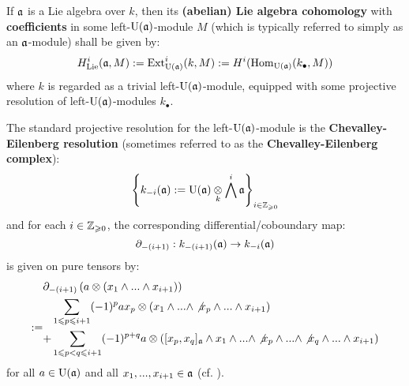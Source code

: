         \begin{definition} \label{def: lie_algebra_cohomology}
            If $\mathfrak{a}$ is a Lie algebra over $k$, then its \textbf{(abelian) Lie algebra cohomology} with \textbf{coefficients} in some left-$\mathrm{U}(\mathfrak{a})$-module $M$ (which is typically referred to simply as an $\mathfrak{a}$-module) shall be given by:
                $$H^i_{\mathrm{Lie}}(\mathfrak{a}, M) := \mathrm{Ext}^i_{\mathrm{U}(\mathfrak{a})}(k, M) := H^i( \mathrm{Hom}_{\mathrm{U}(\mathfrak{a})}(k_{\bullet}, M) )$$
            where $k$ is regarded as a trivial left-$\mathrm{U}(\mathfrak{a})$-module, equipped with some projective resolution of left-$\mathrm{U}(\mathfrak{a})$-modules $k_{\bullet}$.

            The standard projective resolution for the left-$\mathrm{U}(\mathfrak{a})$-module is the \textbf{Chevalley-Eilenberg resolution} (sometimes referred to as the \textbf{Chevalley-Eilenberg complex}):
                $$\left\{ k_{-i}(\a) := \rmU(\a) \tensor_k \bigwedge^i \a \right\}_{i \in \Z_{\geq 0}}$$
            and for each $i \in \mathbb{Z}_{\geqslant 0}$, the corresponding differential/coboundary map:
                $$\partial_{-(i + 1)}: k_{-(i + 1)}(\mathfrak{a}) \to k_{-i}(\mathfrak{a})$$
            is given on pure tensors by:
                $$
                    \begin{aligned}
                        & \del_{-(i + 1)}\left( a \tensor (x_1 \wedge ... \wedge x_{i + 1}) \right)
                        \\
                        := &
                        \begin{aligned}
                            & \sum_{1 \leq p \leq i + 1} (-1)^p a x_p \tensor (x_1 \wedge ... \wedge \not{x_p} \wedge ... \wedge x_{i + 1})
                            \\
                            + & \sum_{1 \leq p < q \leq i + 1} (-1)^{p + q} a \tensor ( [x_p, x_q]_{\a} \wedge x_1 \wedge ... \wedge \not{x_p} \wedge ... \wedge \not{x_q} \wedge ... \wedge x_{i + 1})
                        \end{aligned}
                    \end{aligned}
                $$
            for all $a \in \mathrm{U}(\mathfrak{a})$ and all $x_1, ..., x_{i + 1} \in \mathfrak{a}$ (cf. \cite[Section VII.4]{hilton_stammbach_homological_algebra}).
        \end{definition}
